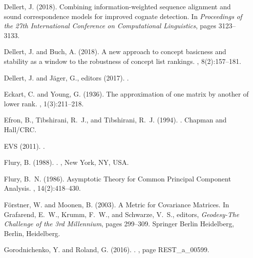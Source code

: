 \documentclass[a4]{article}
\newcommand{\+}[1]{\mathbf{#1}}
\begin{document}
\begin{thebibliography}{}
Dellert, J. (2018).
\newblock Combining information-weighted sequence alignment and sound
  correspondence models for improved cognate detection.
\newblock In {\em Proceedings of the 27th International Conference on
  Computational Linguistics}, pages 3123--3133.

Dellert, J. and Buch, A. (2018).
\newblock A new approach to concept basicness and stability as a window to the
  robustness of concept list rankings.
, 8(2):157--181.

Dellert, J. and J\"{a}ger, G., editors (2017).
.

Eckart, C. and Young, G. (1936).
\newblock The approximation of one matrix by another of lower rank.
, 1(3):211--218.

Efron, B., Tibshirani, R.~J., and Tibshirani, R.~J. (1994).
.
\newblock Chapman and Hall/CRC.

EVS (2011).
.

Flury, B. (1988).
.
, New York, NY, USA.

Flury, B.~N. (1986).
\newblock Asymptotic {{Theory}} for {{Common Principal Component Analysis}}.
, 14(2):418--430.

F\"orstner, W. and Moonen, B. (2003).
\newblock A {{Metric}} for {{Covariance Matrices}}.
\newblock In Grafarend, E.~W., Krumm, F.~W., and Schwarze, V.~S., editors, {\em
  Geodesy-{{The Challenge}} of the 3rd {{Millennium}}}, pages 299--309.
  {Springer Berlin Heidelberg}, Berlin, Heidelberg.

Gorodnichenko, Y. and Roland, G. (2016).
.
, page REST{\_}a{\_}00599.


\end{thebibliography}
\end{document}
